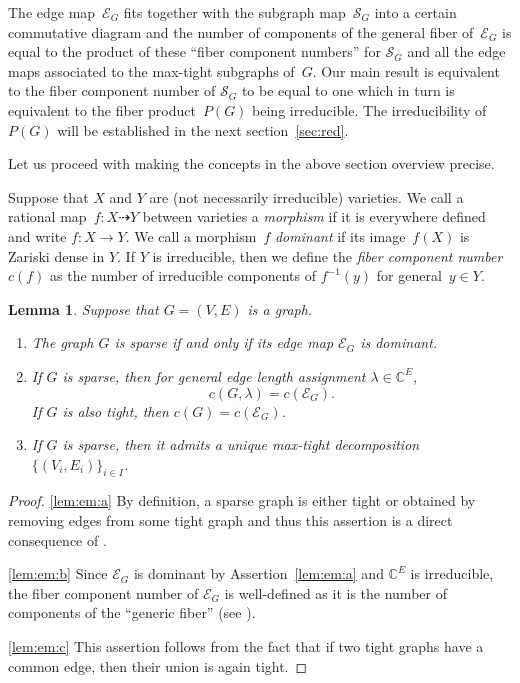 \documentclass[12pt]{article}
\newtheorem{lemma}{Lemma}
\theoremstyle{definition}
\newenvironment{claims}{\begin{enumerate}[topsep=0pt,itemsep=0pt,leftmargin=8mm,label=\textnormal{\textbf{(\alph*)}},ref=(\alph*)]}{\end{enumerate}}
\newcommand{\ASN}[1]{Assertion~\ref{#1}}
\newcommand{\SEC}[1]{\textsection\ref{sec:#1}}
\newcommand{\df}[1]{{\it #1}}
\renewcommand{\c}{\colon}
\newcommand{\dto}{\dasharrow}
\newcommand{\C}{{\mathbb{C}}}
\newcommand{\cE}{\mathcal{E}}
\newcommand{\cS}{\mathcal{S}}
\begin{document}
The edge map~$\cE_G$ fits together with the subgraph map~$\cS_G$ into a certain commutative diagram
and the number of components of the general fiber of~$\cE_G$
is equal to the product of these ``fiber component numbers'' for $\cS_G$
and all the edge maps associated to the max-tight subgraphs of~$G$.
Our main result  is equivalent to the fiber component
number of $\cS_G$ to be equal to one which in turn is equivalent to
the fiber product~$P(G)$ being irreducible.
The irreducibility of $P(G)$ will be established in the next section~\SEC{red}.

Let us proceed with making the concepts in the above section overview precise.

Suppose that $X$ and $Y$ are (not necessarily irreducible) varieties.
We call a rational map~$f\c X\dto Y$ between varieties
a \df{morphism} if it is everywhere defined and write $f\c X\to Y$.
We call a morphism~$f$ \df{dominant} if its image~$f(X)$ is Zariski dense in $Y$.
If $Y$ is irreducible, then we define the \df{fiber component number}~$c(f)$
as the number of irreducible components of $f^{-1}(y)$ for general~$y\in Y$.

\begin{lemma}
\label{lem:em}
Suppose that $G=(V,E)$ is a graph.
\begin{claims}
\item\label{lem:em:a}
The graph $G$ is sparse if and only if its edge map $\cE_G$ is dominant.
\item\label{lem:em:b}
If $G$ is sparse, then for general edge length assignment $\lambda\in\C^E$,
\[
c(G,\lambda)=c(\cE_G).
\]
If $G$ is also tight, then $c(G)=c(\cE_G)$.
\item\label{lem:em:c}
If $G$ is sparse, then it admits a unique max-tight decomposition
$\{(V_i,E_i)\}_{i\in I}$.
\end{claims}
\end{lemma}

\begin{proof}
\ref{lem:em:a}
By definition, a sparse graph is either tight or obtained by removing edges from some tight graph
and thus this assertion is a direct consequence of .

\ref{lem:em:b}
Since $\cE_G$ is dominant by \ASN{lem:em:a} and $\C^E$ is irreducible,
the fiber component number of $\cE_G$ is well-defined as it is the number of components of the ``generic fiber''
(see \citep[Definition~1.5 in Chapter~3]{2002L}).

\ref{lem:em:c}
This assertion follows from the fact that if two tight graphs have a common edge,
then their union is again tight.
\end{proof}
\end{document}
